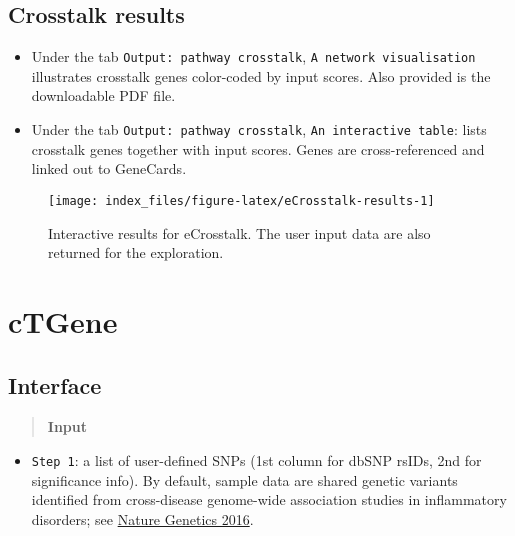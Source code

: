 \documentclass[
  oneside]{book}
\providecommand{\tightlist}{%
  \setlength{\itemsep}{0pt}\setlength{\parskip}{0pt}}
\begin{document}
\hypertarget{crosstalk-results}{%
\section{Crosstalk results}\label{crosstalk-results}}

\begin{itemize}
\item
  Under the tab \texttt{Output:\ pathway\ crosstalk}, \texttt{A\ network\ visualisation} illustrates crosstalk genes color-coded by input scores. Also provided is the downloadable PDF file.
\item
  Under the tab \texttt{Output:\ pathway\ crosstalk}, \texttt{An\ interactive\ table}: lists crosstalk genes together with input scores. Genes are cross-referenced and linked out to GeneCards.
\end{itemize}

\begin{figure}

{\centering \texttt{[image: index\_files/figure-latex/eCrosstalk-results-1]} 

}

\caption{Interactive results for eCrosstalk. The user input data are also returned for the exploration.}\label{fig:eCrosstalk-results}
\end{figure}

\hypertarget{ctgene}{%
\chapter{cTGene}\label{ctgene}}

\hypertarget{interface-3}{%
\section{Interface}\label{interface-3}}

\begin{quote}
\textbf{Input}
\end{quote}

\begin{itemize}
\tightlist
\item
  \texttt{Step\ 1}: a list of user-defined SNPs (1st column for dbSNP rsIDs, 2nd for significance info). By default, sample data are shared genetic variants identified from cross-disease genome-wide association studies in inflammatory disorders; see \href{https://www.ncbi.nlm.nih.gov/pubmed/26974007}{Nature Genetics 2016}.
\end{itemize}
\end{document}
